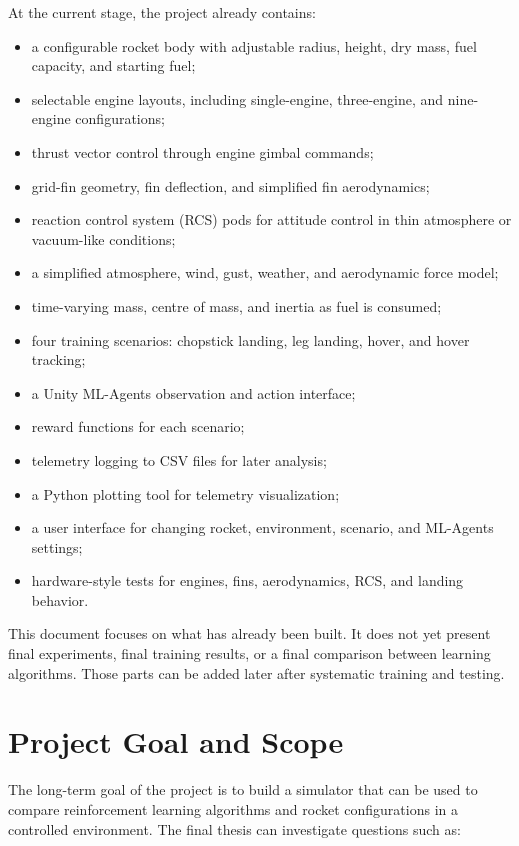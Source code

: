 \documentclass[12pt,a4paper]{article}
\begin{document}
At the current stage, the project already contains:

\begin{itemize}
    \item a configurable rocket body with adjustable radius, height, dry mass, fuel capacity, and starting fuel;
    \item selectable engine layouts, including single-engine, three-engine, and nine-engine configurations;
    \item thrust vector control through engine gimbal commands;
    \item grid-fin geometry, fin deflection, and simplified fin aerodynamics;
    \item reaction control system (RCS) pods for attitude control in thin atmosphere or vacuum-like conditions;
    \item a simplified atmosphere, wind, gust, weather, and aerodynamic force model;
    \item time-varying mass, centre of mass, and inertia as fuel is consumed;
    \item four training scenarios: chopstick landing, leg landing, hover, and hover tracking;
    \item a Unity ML-Agents observation and action interface;
    \item reward functions for each scenario;
    \item telemetry logging to CSV files for later analysis;
    \item a Python plotting tool for telemetry visualization;
    \item a user interface for changing rocket, environment, scenario, and ML-Agents settings;
    \item hardware-style tests for engines, fins, aerodynamics, RCS, and landing behavior.
\end{itemize}

This document focuses on what has already been built. It does not yet present final experiments, final training results, or a final comparison between learning algorithms. Those parts can be added later after systematic training and testing.

\section{Project Goal and Scope}

The long-term goal of the project is to build a simulator that can be used to compare reinforcement learning algorithms and rocket configurations in a controlled environment. The final thesis can investigate questions such as:
\end{document}

